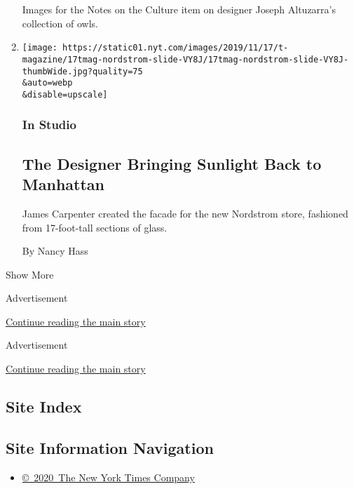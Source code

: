\begin{enumerate}
  Images for the Notes on the Culture item on designer Joseph
  Altuzarra's collection of owls.
\item
  \href{/2019/11/07/t-magazine/james-carpenter-designer.html}{}

  \texttt{[image: https://static01.nyt.com/images/2019/11/17/t-magazine/17tmag-nordstrom-slide-VY8J/17tmag-nordstrom-slide-VY8J-thumbWide.jpg?quality=75\\\&auto=webp\\\&disable=upscale]}

  \hypertarget{in-studio}{%
  \subsubsection{In Studio}\label{in-studio}}

  \hypertarget{the-designer-bringing-sunlight-back-to-manhattan}{%
  \subsection{The Designer Bringing Sunlight Back to
  Manhattan}\label{the-designer-bringing-sunlight-back-to-manhattan}}

  James Carpenter created the facade for the new Nordstrom store,
  fashioned from 17-foot-tall sections of glass.

  By Nancy Hass
\end{enumerate}

Show More

Advertisement

\protect\hyperlink{after-mid2}{Continue reading the main story}

Advertisement

\protect\hyperlink{after-mktg}{Continue reading the main story}

\hypertarget{site-index}{%
\subsection{Site Index}\label{site-index}}

\hypertarget{site-information-navigation}{%
\subsection{Site Information
Navigation}\label{site-information-navigation}}

\begin{itemize}
\tightlist
\item
  \href{https://help.nytimes.com/hc/en-us/articles/115014792127-Copyright-notice}{©~2020~The
  New York Times Company}
\end{itemize}

